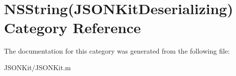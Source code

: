 \hypertarget{category_n_s_string_07_j_s_o_n_kit_deserializing_08}{\section{N\+S\+String(J\+S\+O\+N\+Kit\+Deserializing) Category Reference}
\label{category_n_s_string_07_j_s_o_n_kit_deserializing_08}
}


The documentation for this category was generated from the following file\+:\begin{DoxyCompactItemize}
\item 
J\+S\+O\+N\+Kit/J\+S\+O\+N\+Kit.\+m\end{DoxyCompactItemize}
